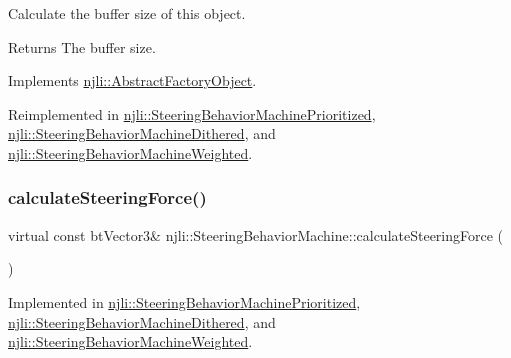 Calculate the buffer size of this object.

\begin{DoxyReturn}{Returns}
The buffer size. 
\end{DoxyReturn}


Implements \mbox{\hyperlink{classnjli_1_1_abstract_factory_object_a4763d05bc9dc37c559111f8bb30e1dd8}{njli\+::\+Abstract\+Factory\+Object}}.



Reimplemented in \mbox{\hyperlink{classnjli_1_1_steering_behavior_machine_prioritized_aa05ec0e843f46f25b03794f0a9a9f483}{njli\+::\+Steering\+Behavior\+Machine\+Prioritized}}, \mbox{\hyperlink{classnjli_1_1_steering_behavior_machine_dithered_a72434033db333ed95de03c579eb96c15}{njli\+::\+Steering\+Behavior\+Machine\+Dithered}}, and \mbox{\hyperlink{classnjli_1_1_steering_behavior_machine_weighted_a7e689fadcc5631e53fe3b9ec972ad70e}{njli\+::\+Steering\+Behavior\+Machine\+Weighted}}.

\mbox{\label{classnjli_1_1_steering_behavior_machine_aea431466acb4ef73220206bbcd515a9a}} 
\subsubsection{\texorpdfstring{calculate\+Steering\+Force()}{calculateSteeringForce()}}
{\footnotesize\ttfamily virtual const bt\+Vector3\& njli\+::\+Steering\+Behavior\+Machine\+::calculate\+Steering\+Force (\begin{DoxyParamCaption}{ }\end{DoxyParamCaption})\hspace{0.3cm}{\ttfamily [pure virtual]}}



Implemented in \mbox{\hyperlink{classnjli_1_1_steering_behavior_machine_prioritized_a3260a17ae2fe1f5fb128915e3d2ab1b6}{njli\+::\+Steering\+Behavior\+Machine\+Prioritized}}, \mbox{\hyperlink{classnjli_1_1_steering_behavior_machine_dithered_a9523006f50dc2ba0e2d6e3063c054ec4}{njli\+::\+Steering\+Behavior\+Machine\+Dithered}}, and \mbox{\hyperlink{classnjli_1_1_steering_behavior_machine_weighted_a14497ce93400f5c851a4ff412f2e050a}{njli\+::\+Steering\+Behavior\+Machine\+Weighted}}.


